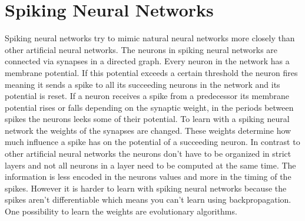 \section{Spiking Neural Networks}
Spiking neural networks try to mimic natural neural networks more closely than other artificial neural networks.
The neurons in spiking neural networks are connected via synapses in a directed graph.
Every neuron in the network has a membrane potential.
If this potential exceeds a certain threshold the neuron fires meaning it sends a spike to all its succeeding neurons in the network and its potential is reset.
If a neuron receives a spike from a predecessor its membrane potential rises or falls depending on the synaptic weight, in the periods between spikes the neurons leeks some of their potential.
To learn with a spiking neural network the weights of the synapses are changed.
These weights determine how much influence a spike has on the potential of a succeeding neuron.
In contrast to other artificial neural networks the neurons don't have to be organized in strict layers and not all neurons in a layer need to be computed at the same time.
The information is less encoded in the neurons values and more in the timing of the spikes.
However it is harder to learn with spiking neural networks because the spikes aren't differentiable which means you can't learn using backpropagation.
One possibility to learn the weights are evolutionary algorithms.